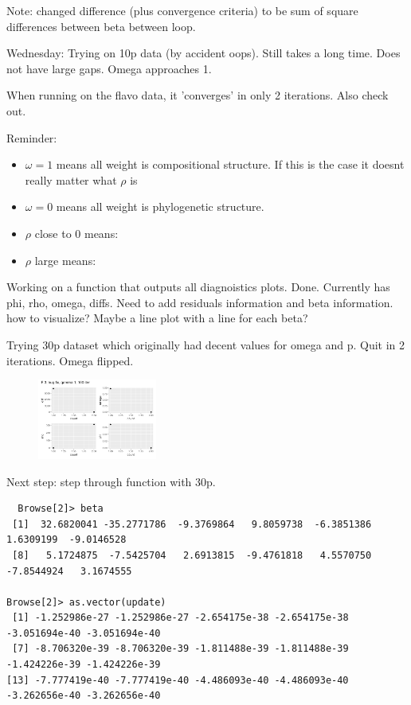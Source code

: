 \documentclass[10pt]{article}
\theoremstyle{definition}
\begin{document}
Note: changed difference (plus convergence criteria) to be sum of square differences between beta between loop.

Wednesday:
Trying on 10p data (by accident oops). Still takes a long time.
Does not have large gaps. Omega approaches 1.


When running on the flavo data, it 'converges' in only 2 iterations. Also check out.

Reminder:
\begin{itemize}
  \item $\omega = 1$ means all weight is compositional structure. If this is the case it doesnt really matter what $\rho $ is
  \item $\omega = 0$ means all weight is phylogenetic structure.
  \item $\rho$ close to 0 means:
  \item $\rho$ large means:
\end{itemize}

Working on a function that outputs all diagnoistics plots. Done. Currently has phi, rho, omega, diffs. Need to add residuals information and beta information. how to visualize? Maybe a line plot with a line for each beta?

Trying 30p dataset which originally had decent values for omega and p.
Quit in 2 iterations. Omega flipped.

\begin{figure}[!htb]
	\centering
	\includegraphics[width=0.35\textwidth]{img/Temp_week_journal-8b0e2d13.png}
	\caption{}
	\label{}
\end{figure}

Next step: step through function with 30p.

\begin{verbatim}
  Browse[2]> beta
 [1]  32.6820041 -35.2771786  -9.3769864   9.8059738  -6.3851386   1.6309199  -9.0146528
 [8]   5.1724875  -7.5425704   2.6913815  -9.4761818   4.5570750  -7.8544924   3.1674555

Browse[2]> as.vector(update)
 [1] -1.252986e-27 -1.252986e-27 -2.654175e-38 -2.654175e-38 -3.051694e-40 -3.051694e-40
 [7] -8.706320e-39 -8.706320e-39 -1.811488e-39 -1.811488e-39 -1.424226e-39 -1.424226e-39
[13] -7.777419e-40 -7.777419e-40 -4.486093e-40 -4.486093e-40 -3.262656e-40 -3.262656e-40
\end{verbatim}
\end{document}
